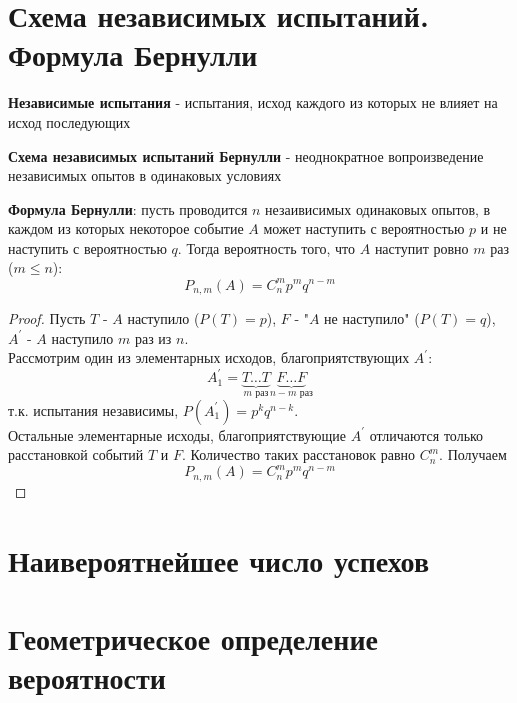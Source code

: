    \section{Схема независимых испытаний. Формула Бернулли}

    \begin{opr}
        \textbf{Независимые испытания} - испытания, исход каждого
        из которых не влияет на исход последующих
    \end{opr}

    \begin{opr}
        \textbf{Схема независимых испытаний Бернулли} - неоднократное
        вопроизведение независимых опытов в одинаковых условиях
    \end{opr}

    \begin{thm}
        \textbf{Формула Бернулли}: пусть проводится \(n\) незаивисимых одинаковых опытов, 
        в каждом из которых некоторое событие \(A\) может наступить с вероятностью \(p\) 
        и не наступить с вероятностью \(q\). Тогда вероятность того, что \(A\) наступит 
        ровно \(m\) раз (\(m \leq n\)):
        \begin{equation}
            P_{n, m}(A) = C^{m}_{n} p^{m} q^{n - m}
        \end{equation}

        \begin{proof}
            Пусть \(T\) - \(A\) наступило (\(P(T) = p\)), \(F\) - "\(A\) не наступило" 
            (\(P(T) = q\)), \(A^{'}\) - \( A \) наступило \(m\) раз из \(n\).\\
            Рассмотрим один из элементарных исходов, благоприятствующих 
            \(A^{'}\):
            \begin{equation}
                A_{1}^{'} = \underbrace{T\dots T}_{\text{\(m\) раз}}
                            \underbrace{F\dots F}_{\text{\(n - m\) раз}}
            \end{equation}
            т.к. испытания независимы, \(P(A_{1}^{'}) = p^{k}q^{n - k}\).\\
            Остальные элементарные исходы, благоприятствующие \(A^{'}\)
            отличаются только расстановкой событий \(T\) и \(F\). Количество таких 
            расстановок равно \(C^{m}_{n}\). Получаем
            \begin{equation}
                P_{n, m}(A) = C^{m}_{n} p^{m} q^{n - m}
            \end{equation}
        \end{proof}
    \end{thm}

    \section{Наивероятнейшее число успехов}

    \section{Геометрическое определение вероятности}


